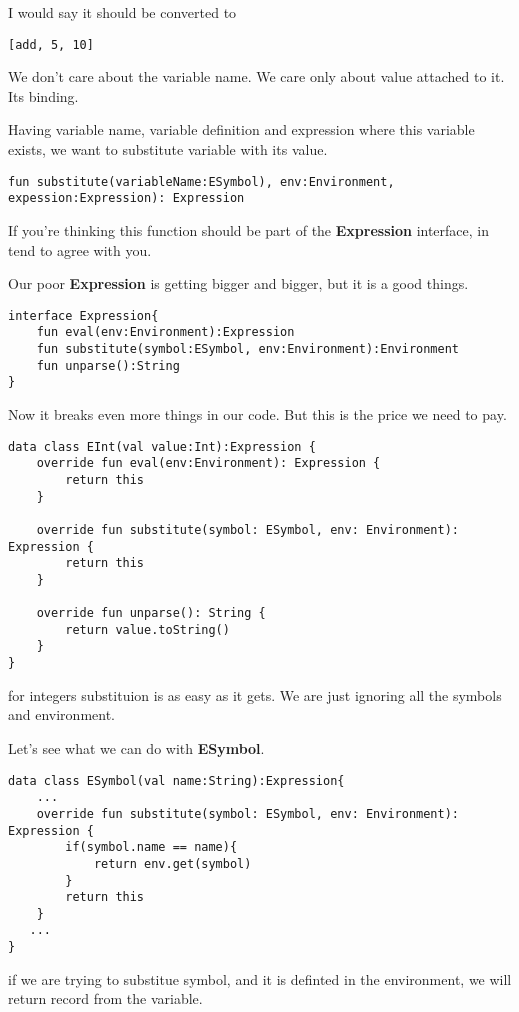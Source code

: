 \documentclass[11pt]{article}
\begin{document}
I would say it should be converted to
\begin{verbatim}
[add, 5, 10]
\end{verbatim}
We don't care about the variable name. We care only about value attached to it. Its binding.

Having variable name, variable definition and expression where this variable exists, we want to substitute variable with its value.

\begin{verbatim}
fun substitute(variableName:ESymbol), env:Environment, expession:Expression): Expression
\end{verbatim}

If you're thinking this function should be part of the \textbf{Expression} interface, in tend to agree with you.

Our poor \textbf{Expression} is getting bigger and bigger, but it is a good things.

\begin{verbatim}
interface Expression{
    fun eval(env:Environment):Expression
    fun substitute(symbol:ESymbol, env:Environment):Environment
    fun unparse():String
}
\end{verbatim}

Now it breaks even more things in our code. But this is the price we need to pay.

\begin{verbatim}
data class EInt(val value:Int):Expression {
    override fun eval(env:Environment): Expression {
        return this
    }

    override fun substitute(symbol: ESymbol, env: Environment): Expression {
        return this
    }

    override fun unparse(): String {
        return value.toString()
    }
}
\end{verbatim}

for integers substituion is as easy as it gets.
We are just ignoring all the symbols and environment.

Let's see what we can do with \textbf{ESymbol}.
\begin{verbatim}
data class ESymbol(val name:String):Expression{
    ...
    override fun substitute(symbol: ESymbol, env: Environment): Expression {
        if(symbol.name == name){
            return env.get(symbol)
        }
        return this
    }
   ...
}
\end{verbatim}

if we are trying to substitue symbol, and it is definted in the environment, we will return record from the variable.
\end{document}
